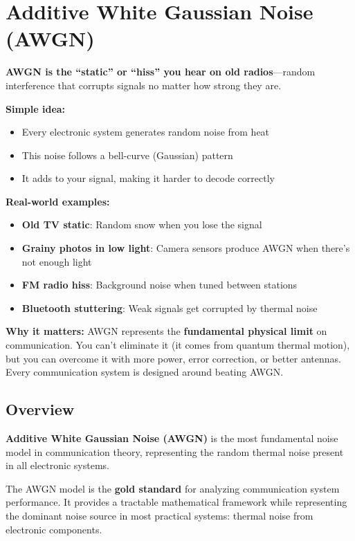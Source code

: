 \chapter{Additive White Gaussian Noise (AWGN)}
\label{ch:awgn}

\begin{nontechnical}
\textbf{AWGN is the ``static'' or ``hiss'' you hear on old radios}---random interference that corrupts signals no matter how strong they are.

\textbf{Simple idea:}
\begin{itemize}
\item Every electronic system generates random noise from heat
\item This noise follows a bell-curve (Gaussian) pattern
\item It adds to your signal, making it harder to decode correctly
\end{itemize}

\textbf{Real-world examples:}
\begin{itemize}
\item \textbf{Old TV static}: Random snow when you lose the signal
\item \textbf{Grainy photos in low light}: Camera sensors produce AWGN when there's not enough light
\item \textbf{FM radio hiss}: Background noise when tuned between stations
\item \textbf{Bluetooth stuttering}: Weak signals get corrupted by thermal noise
\end{itemize}

\textbf{Why it matters:} AWGN represents the \textbf{fundamental physical limit} on communication. You can't eliminate it (it comes from quantum thermal motion), but you can overcome it with more power, error correction, or better antennas. Every communication system is designed around beating AWGN.
\end{nontechnical}

\section{Overview}

\textbf{Additive White Gaussian Noise (AWGN)} is the most fundamental noise model in communication theory, representing the random thermal noise present in all electronic systems.

\begin{keyconcept}
The AWGN model is the \textbf{gold standard} for analyzing communication system performance. It provides a tractable mathematical framework while representing the dominant noise source in most practical systems: thermal noise from electronic components.
\end{keyconcept}

